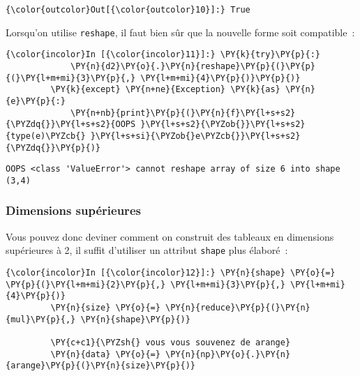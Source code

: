 \begin{Verbatim}[commandchars=\\\{\},frame=single,framerule=0.3mm,rulecolor=\color{cellframecolor}]
{\color{outcolor}Out[{\color{outcolor}10}]:} True
\end{Verbatim}
            
    Lorsqu'on utilise \texttt{reshape}, il faut bien sûr que la nouvelle
forme soit compatible~:

    \begin{Verbatim}[commandchars=\\\{\},frame=single,framerule=0.3mm,rulecolor=\color{cellframecolor}]
{\color{incolor}In [{\color{incolor}11}]:} \PY{k}{try}\PY{p}{:}
             \PY{n}{d2}\PY{o}{.}\PY{n}{reshape}\PY{p}{(}\PY{p}{(}\PY{l+m+mi}{3}\PY{p}{,} \PY{l+m+mi}{4}\PY{p}{)}\PY{p}{)}
         \PY{k}{except} \PY{n+ne}{Exception} \PY{k}{as} \PY{n}{e}\PY{p}{:}
             \PY{n+nb}{print}\PY{p}{(}\PY{n}{f}\PY{l+s+s2}{\PYZdq{}}\PY{l+s+s2}{OOPS }\PY{l+s+s2}{\PYZob{}}\PY{l+s+s2}{type(e)\PYZcb{} }\PY{l+s+si}{\PYZob{}e\PYZcb{}}\PY{l+s+s2}{\PYZdq{}}\PY{p}{)}
\end{Verbatim}


    \begin{Verbatim}[commandchars=\\\{\},frame=single,framerule=0.3mm,rulecolor=\color{cellframecolor}]
OOPS <class 'ValueError'> cannot reshape array of size 6 into shape (3,4)
\end{Verbatim}

    \hypertarget{dimensions-supuxe9rieures}{%
\subsubsection{Dimensions supérieures}\label{dimensions-supuxe9rieures}}

    Vous pouvez donc deviner comment on construit des tableaux en dimensions
supérieures à 2, il suffit d'utiliser un attribut \texttt{shape} plus
élaboré~:

    \begin{Verbatim}[commandchars=\\\{\},frame=single,framerule=0.3mm,rulecolor=\color{cellframecolor}]
{\color{incolor}In [{\color{incolor}12}]:} \PY{n}{shape} \PY{o}{=} \PY{p}{(}\PY{l+m+mi}{2}\PY{p}{,} \PY{l+m+mi}{3}\PY{p}{,} \PY{l+m+mi}{4}\PY{p}{)}
         \PY{n}{size} \PY{o}{=} \PY{n}{reduce}\PY{p}{(}\PY{n}{mul}\PY{p}{,} \PY{n}{shape}\PY{p}{)}
         
         \PY{c+c1}{\PYZsh{} vous vous souvenez de arange}
         \PY{n}{data} \PY{o}{=} \PY{n}{np}\PY{o}{.}\PY{n}{arange}\PY{p}{(}\PY{n}{size}\PY{p}{)}
\end{Verbatim}


